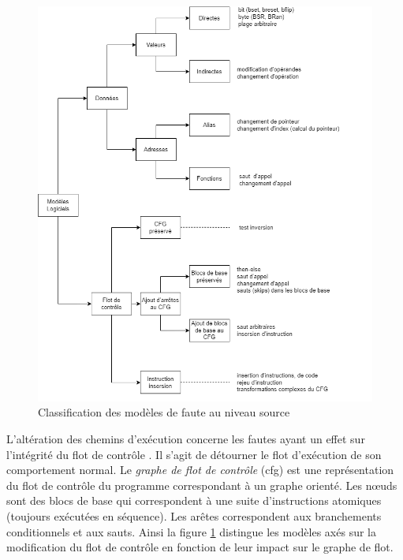                 \begin{figure}[ht!]\centering
                  \includegraphics[scale=0.49]{ch2-background/img/Class Logiciel.drawio.png}
                  \caption{Classification des modèles de faute au niveau source}
                  \label{fig:software-models-scheme}
                \end{figure}
            
                L'altération des chemins d'exécution concerne les fautes ayant un effet sur l'intégrité du flot de contrôle \cite{Abadi/TISSEC09, Sayeed/AS19}. Il s'agit de détourner le flot d'exécution de son comportement normal.
                Le \textit{graphe de flot de contrôle} (\gls{cfg}) est une représentation du flot de contrôle du programme correspondant à un graphe orienté. 
                Les nœuds sont des blocs de base qui correspondent à une suite d'instructions atomiques (toujours exécutées en séquence).
                Les arêtes correspondent aux branchements conditionnels et aux sauts.
                Ainsi la figure \ref{fig:software-models-scheme} distingue les modèles axés sur la modification du flot de contrôle en fonction de leur impact sur le graphe de flot.
                

